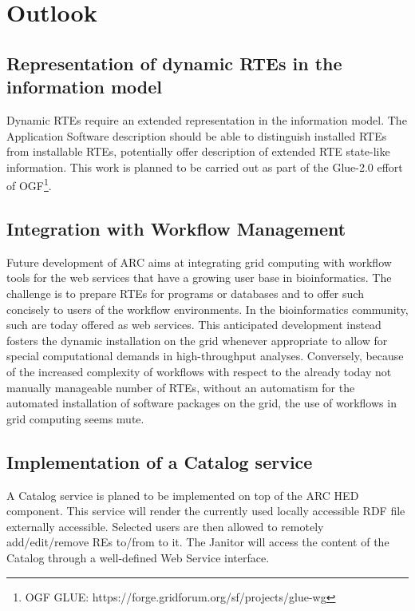 \chapter{Outlook}
% 
% 

\section{Representation of dynamic RTEs in the information model}
Dynamic RTEs require an extended representation in the
information model.  The Application Software description should be able
to distinguish installed RTEs from installable RTEs, potentially offer
description of extended RTE state-like information. This work is planned
to be carried out as part of the Glue-2.0 effort of OGF\footnote{OGF
GLUE: https://forge.gridforum.org/sf/projects/glue-wg}.

\section{Integration with Workflow Management}

Future development of ARC aims at integrating grid computing with
workflow tools for the web services that have a growing user base in
bioinformatics. The challenge is to prepare RTEs for
programs or databases and to offer such concisely to users of the
workflow environments.  In the bioinformatics community, such are
today offered as web services.  This anticipated development instead
fosters the dynamic installation on the grid whenever appropriate to
allow for special computational demands in high-throughput analyses.
Conversely, because of the increased complexity of workflows with respect
to the already today not manually manageable number of RTEs, without an
automatism for the automated installation of software packages on the
grid, the use of workflows in grid computing seems mute.

\section{Implementation of a Catalog service}
 
A Catalog service is planed to be implemented on top of the ARC
HED component.  This service will render the currently used locally
accessible RDF file externally accessible. Selected users are then allowed
to remotely add/edit/remove REs to/from to it.  The Janitor will access
the content of the Catalog through a well-defined Web Service interface.

